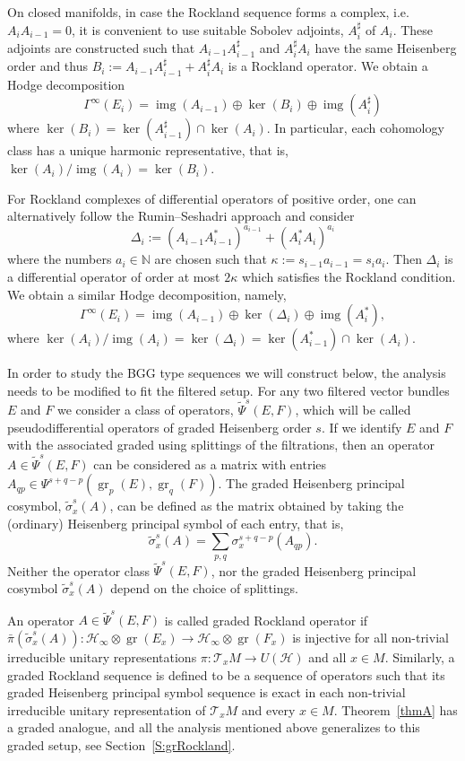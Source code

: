 \documentclass[reqno,12pt]{amsart}
\DeclareMathOperator{\img}{img}
\DeclareMathOperator{\gr}{gr}
\newcommand\N{\mathbb N}
\theoremstyle{plain}
\theoremstyle{definition}
\begin{document}
On closed manifolds, in case the Rockland sequence forms a complex, i.e.\ $A_iA_{i-1}=0$, it is convenient to use suitable Sobolev adjoints, $A_i^\sharp$ of $A_i$.
These adjoints are constructed such that $A_{i-1}A_{i-1}^\sharp$ and $A_i^\sharp A_i$ have the same Heisenberg order and thus $B_i:=A_{i-1}A_{i-1}^\sharp+A_i^\sharp A_i$ is a Rockland operator.
We obtain a Hodge decomposition
$$
\Gamma^\infty(E_i)=\img(A_{i-1})\oplus\ker(B_i)\oplus\img(A_i^\sharp)
$$
where $\ker(B_i)=\ker(A_{i-1}^\sharp)\cap\ker(A_i)$.
In particular, each cohomology class has a unique harmonic representative, that is, $\ker(A_i)/\img(A_i)=\ker(B_i)$.


For Rockland complexes of differential operators of positive order, one can alternatively follow the Rumin--Seshadri approach \cite{RS12} and consider 
\begin{equation}\label{E:IRS}
\Delta_i:=(A_{i-1}A_{i-1}^*)^{a_{i-1}}+(A_i^*A_i)^{a_i}
\end{equation}
where the numbers $a_i\in\N$ are chosen such that $\kappa:=s_{i-1}a_{i-1}=s_ia_i$.
Then $\Delta_i$ is a differential operator of order at most $2\kappa$ which satisfies the Rockland condition.
We obtain a similar Hodge decomposition, namely,
$$
\Gamma^\infty(E_i)=\img(A_{i-1})\oplus\ker(\Delta_i)\oplus\img(A_i^*),
$$
where $\ker(A_i)/\img(A_i)=\ker(\Delta_i)=\ker(A_{i-1}^*)\cap\ker(A_i)$.


In order to study the BGG type sequences we will construct below, the analysis needs to be modified to fit the filtered setup.
For any two filtered vector bundles $E$ and $F$ we consider a class of operators, $\tilde\Psi^s(E,F)$, which will be called pseudodifferential operators of graded Heisenberg order $s$.
If we identify $E$ and $F$ with the associated graded using splittings of the filtrations, then an operator $A\in\tilde\Psi^s(E,F)$ can be considered as a matrix with entries $A_{qp}\in\Psi^{s+q-p}(\gr_p(E),\gr_q(F))$.
The graded Heisenberg principal cosymbol, $\tilde\sigma^s_x(A)$, can be defined as the matrix obtained by taking the (ordinary) Heisenberg principal symbol of each entry, that is, 
$$
\tilde\sigma^s_x(A)=\sum_{p,q}\sigma^{s+q-p}_x(A_{qp}).
$$
Neither the operator class $\tilde\Psi^s(E,F)$, nor the graded Heisenberg principal cosymbol $\tilde\sigma^s_x(A)$ depend on the choice of splittings.


An operator $A\in\tilde\Psi^s(E,F)$ is called graded Rockland operator if $\bar\pi(\tilde\sigma^s_x(A))\colon\mathcal H_\infty\otimes\gr(E_x)\to\mathcal H_\infty\otimes\gr(F_x)$ is injective for all non-trivial irreducible unitary representations $\pi\colon\mathcal T_xM\to U(\mathcal H)$ and all $x\in M$.
Similarly, a graded Rockland sequence is defined to be a sequence of operators such that its graded Heisenberg principal symbol sequence is exact in each non-trivial irreducible unitary representation of $\mathcal T_xM$ and every $x\in M$.
Theorem~\ref{thmA} has a graded analogue, and all the analysis mentioned above generalizes to this graded setup, see Section~\ref{S:grRockland}.
\end{document}
